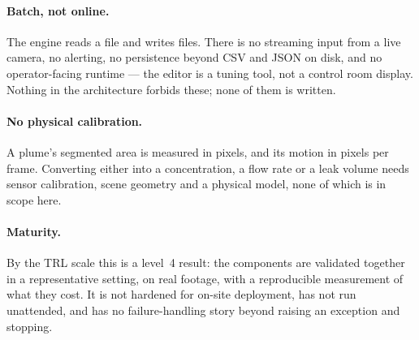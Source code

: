 \paragraph{Batch, not online.} The engine reads a file and writes files. There is
no streaming input from a live camera, no alerting, no persistence beyond CSV and
JSON on disk, and no operator-facing runtime --- the editor is a tuning tool, not
a control room display. Nothing in the architecture forbids these; none of them
is written.

\paragraph{No physical calibration.} A plume's segmented area is measured in
pixels, and its motion in pixels per frame. Converting either into a
concentration, a flow rate or a leak volume needs sensor calibration, scene
geometry and a physical model, none of which is in scope here.

\paragraph{Maturity.} By the TRL scale this is a level~4 result: the components
are validated together in a representative setting, on real footage, with a
reproducible measurement of what they cost. It is not hardened for on-site
deployment, has not run unattended, and has no failure-handling story beyond
raising an exception and stopping.
